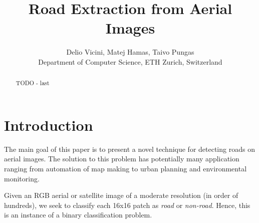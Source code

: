 \documentclass[10pt,conference,compsocconf]{IEEEtran}
\begin{document}
\title{Road Extraction from Aerial Images}
\author{
  Delio Vicini, Matej Hamas, Taivo Pungas\\
  Department of Computer Science, ETH Zurich, Switzerland
}

\maketitle

\begin{abstract}
  TODO - last
\end{abstract}

\section{Introduction}
\label{sec:intro}

The main goal of this paper is to present a novel technique for detecting roads on aerial images. The solution to this problem has potentially many application ranging from automation of map making to urban planning and environmental monitoring.

Given an RGB aerial or satellite image of a moderate resolution (in order of hundreds), we seek to classify each 16x16 patch as \textit{road} or \textit{non-road}. Hence, this is an instance of a binary classification problem.
\end{document}
